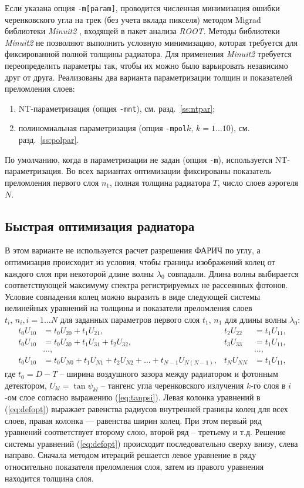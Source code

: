 \documentclass[12pt]{article}
\begin{document}
Если указана опция {\tt -m[param]}, проводится численная минимизация ошибки черенковского угла на трек (без учета вклада пикселя) 
методом Migrad библиотеки {\em Minuit2} \cite{minuit2}, входящей в пакет анализа {\em ROOT}. Методы библиотеки {\em Minuit2} не 
позволяют выполнить условную минимизацию, которая требуется для фиксированной полной толщины радиатора. 
Для применения {\em Minuit2} требуется переопределить параметры так, чтобы их можно было варьировать независимо друг от друга.
Реализованы два варианта параметризации толщин и показателей преломления слоев:
\begin{enumerate}
\item NT-параметризация (опция {\tt -mnt}), см. разд.~\ref{ss:ntpar};
\item полиномиальная параметризация (опция {\tt -mpol$k$}, $k=1\ldots 10$), см. разд.~\ref{ss:polpar}.
\end{enumerate}
По умолчанию, когда в параметризации не задан (опция {\tt -m}), используется NT-параметризация.
Во всех вариантах оптимизации фиксированы показатель преломления первого слоя $n_1$, полная толщина радиатора $T$, число слоев аэрогеля $N$.

\subsection{Быстрая оптимизация радиатора}
\label{ss:defopt}
В этом варианте не используется расчет разрешения ФАРИЧ по углу, а оптимизация происходит из условия, чтобы границы изображений колец от каждого слоя при 
некоторой длине волны $\lambda_0$ совпадали. Длина волны выбирается соответствующей максимуму спектра регистрируемых не рассеянных фотонов.
Условие совпадения колец можно выразить в виде следующей системы нелинейных уравнений на толщины и показатели преломления слоев $t_i,\,n_i, i=1\ldots N$ для заданных
параметров первого слоя $t_1,\,n_1$ для длины волны $\lambda_0$:
\begin{align}\label{eq:defopt}
t_0 U_{10} & = t_0 U_{20} + t_1 U_{21},              & t_2 U_{22} & = t_1 U_{11}, \nonumber\\
t_0 U_{10} & = t_0 U_{30} + t_1 U_{31} + t_2 U_{32}, & t_3 U_{33} & = t_1 U_{11}, \nonumber\\
& \ldots, & & \ldots, \\
t_0 U_{10} & = t_0 U_{N0} + t_1 U_{N1} + t_2 U_{N2} + \ldots + t_{N-1} U_{N(N-1)}, & t_N U_{NN} & = t_1 U_{11}, \nonumber
\end{align}
где $t_0=D-T$ -- ширина воздушного зазора между радиатором и фотонным детектором, $U_{kl} = \tan\psi_{kl}$ -- тангенс угла черенковского излучения $k$-го слоя в $i$-ом слое
согласно выражению (\ref{eq:tanpsi}). Левая колонка уравнений в (\ref{eq:defopt}) выражает равенства радиусов внутренней границы колец для всех слоев, правая колонка --- равенства
ширин колец. При этом первый ряд уравнений соответствует второму слою, второй ряд -- третьему и т.д. Решение системы уравнений (\ref{eq:defopt}) происходит последовательно 
сверху внизу, слева направо. Сначала методом итераций решается левое уравнение в ряду относительно показателя преломления слоя, затем из правого уравнения находится толщина слоя.
\end{document}
